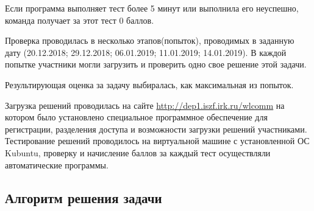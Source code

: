 Если программа выполняет тест более 5 минут или выполнила его неуспешно,  команда получает  за этот тест 0 баллов.

Проверка проводилась в несколько этапов(попыток), проводимых в заданную дату (20.12.2018; 29.12.2018; 06.01.2019; 11.01.2019; 14.01.2019). В каждой попытке участники могли загрузить и проверить одно свое решение этой задачи.

Результирующая оценка за задачу выбиралась, как максимальная из попыток.

Загрузка решений проводилась на сайте \url{http://dep1.iszf.irk.ru/wlcomm} на котором было установлено специальное программное обеспечение для регистрации, разделения доступа и возможности загрузки решений участниками.
Тестирование решений проводилось на виртуальной машине с установленной ОС Kubuntu, проверку и начисление баллов за каждый тест осуществляли автоматические программы.

\subsection*{Алгоритм решения задачи}


